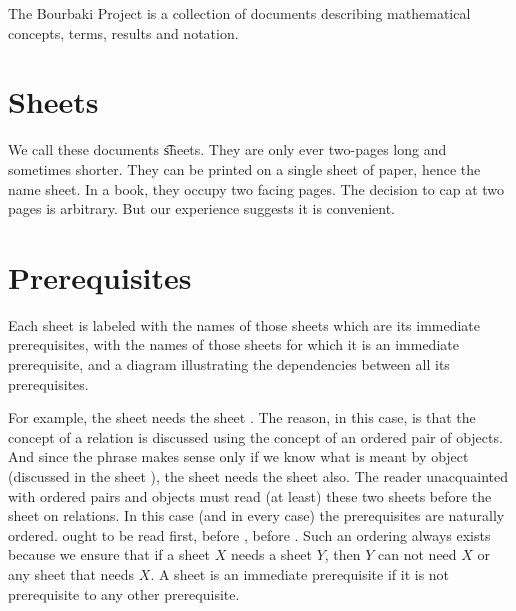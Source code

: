 

The Bourbaki Project is a collection of documents describing mathematical concepts, terms, results and notation.


\section*{Sheets}

We call these documents \t{sheets}.
They are only ever two-pages long and sometimes shorter.
They can be printed on a single sheet of paper, hence the name sheet.
In a book, they occupy two facing pages.
The decision to cap at two pages is arbitrary.
But our experience suggests it is convenient.

\section*{Prerequisites}

Each sheet is labeled with the names of those sheets which are its immediate prerequisites, with the names of those sheets for which it is an immediate prerequisite, and a diagram illustrating the dependencies between all its prerequisites.

For example, the sheet needs the sheet .
The reason, in this case, is that the concept of a relation is discussed using the concept of an ordered pair of objects.
And since the phrase  makes sense only if we know what is meant by object (discussed in the sheet ), the sheet needs the sheet  also.
The reader unacquainted with ordered pairs and objects must read (at least) these two sheets before the sheet on relations.
In this case (and in every case) the prerequisites are naturally ordered.
 ought to be read first, before , before .
Such an ordering always exists because we ensure that if a sheet $X$ needs a sheet $Y$, then $Y$ can not need $X$ or any sheet that needs $X$.
A sheet is an immediate prerequisite if it is not prerequisite to any other prerequisite.

